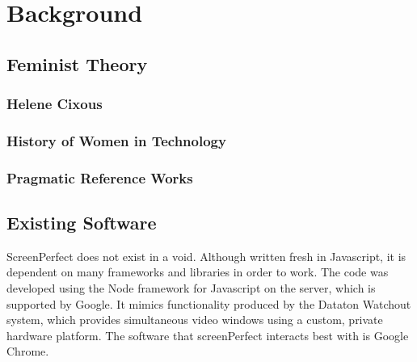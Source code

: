 
\chapter{Background} %

\label{Chapter2} %





\section{Feminist Theory}

\subsection{Helene Cixous}

\subsection{History of Women in Technology}

\subsection{Pragmatic Reference Works}




\section{Existing Software}
ScreenPerfect does not exist in a void. Although written fresh in Javascript, it is dependent on many frameworks and libraries in order to work. The code was developed using the Node framework for Javascript on the server, which is supported by Google. It mimics functionality produced by the Dataton Watchout system, which provides simultaneous video windows using a custom, private hardware platform. The software that screenPerfect interacts best with is Google Chrome.

